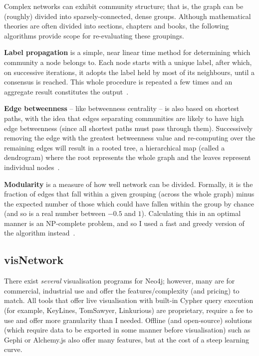 Complex networks can exhibit community structure; that is, the graph can be
(roughly) divided into sparsely-connected, dense groups. Although mathematical
theories are often divided into sections, chapters and books, the following
algorithms provide scope for re-evaluating these groupings.

\textbf{Label propagation} is a simple, near linear time method for
determining which community a node belongs to. Each node starts with a unique
label, after which, on successive iterations, it adopts the label held by most
of its neighbours, until a consensus is reached. This whole procedure is
repeated a few times and an aggregate result constitutes the
output~{\citep{raghavan2007}}.

\textbf{Edge betweenness} -- like betweenness centrality -- is also based on
shortest paths, with the idea that edges separating communities are likely to
have high edge betweenness (since all shortest paths must pass through them).
Successively removing the edge with the greatest betweenness value and
re-computing over the remaining edges will result in a rooted tree, a
hierarchical map (called a dendrogram) where the root represents the whole graph
and the leaves represent individual nodes~{\citep{newman2004}}.

\textbf{Modularity} is a measure of how well network can be divided.  Formally,
it is the fraction of edges that fall within a given grouping (across the whole
graph) minus the expected number of those which could have fallen within the
group by chance (and so is a real number between $-0.5$ and $1$). Calculating
this in an optimal manner is an NP-complete problem, and so I used a fast and
greedy version of the algorithm instead~{\citep{clauset2004}}.

\subsection{visNetwork}

There exist \emph{several} visualisation programs for Neo4j; however, many are
for commercial, industrial use and offer the features/complexity (and pricing)
to match. All tools that offer live visualisation with built-in Cypher query
execution (for example, KeyLines, TomSawyer, Linkurious) are proprietary, require a fee
to use and offer more granularity than I needed. Offline (and open-source)
solutions (which require data to be exported in some manner before
visualisation) such as Gephi or Alchemy.js also offer many features, but at
the cost of a steep learning curve. 

